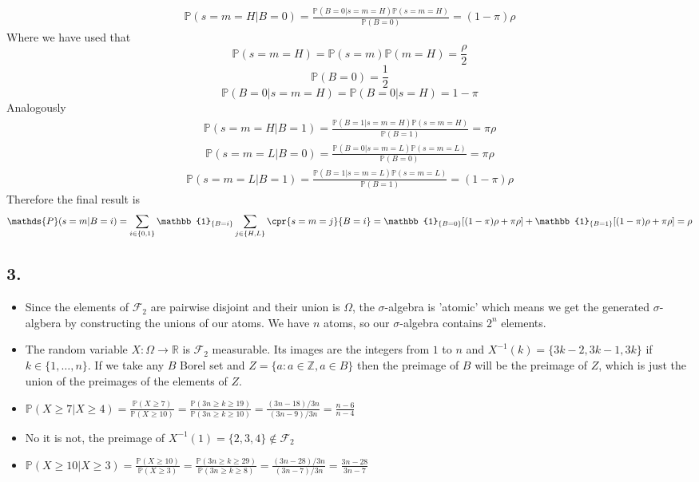     \begin{gather*}
    \mathds{P}(s=m=H|B=0)=\frac{\mathds{P}(B=0|s=m=H)\mathds{P}(s=m=H)}{\mathds{P}(B=0)} = (1-\pi)\rho
    \end{gather*}
    Where we have used that
    $$\mathds{P}(s=m=H)=\mathds{P}(s=m)\mathds{P}(m=H)=\frac{\rho}{2}$$
    $$\mathds{P}(B=0)=\frac{1}{2}$$
    $$\mathds{P}(B=0|s=m=H)=\mathds{P}(B=0|s=H)=1-\pi$$
    Analogously
    \begin{gather*}
    \mathds{P}(s=m=H|B=1)=\frac{\mathds{P}(B=1|s=m=H)\mathds{P}(s=m=H)}{\mathds{P}(B=1)} = \pi\rho
    \end{gather*}
    \begin{gather*}
    \mathds{P}(s=m=L|B=0)=\frac{\mathds{P}(B=0|s=m=L)\mathds{P}(s=m=L)}{\mathds{P}(B=0)} = \pi\rho
    \end{gather*}
        \begin{gather*}
    \mathds{P}(s=m=L|B=1)=\frac{\mathds{P}(B=1|s=m=L)\mathds{P}(s=m=L)}{\mathds{P}(B=1)} = (1-\pi)\rho
    \end{gather*}
    Therefore the final result is
    \begin{gather*}
        \mathds{P}(s=m|B=i)=\sum_{i\in\{0,1\}}\mathbb{1}_{\{B=i\}}
        \sum_{j\in\{H,L\}}\cpr{s=m=j}{B=i}=\mathbb{1}_{\{B=0\}}[(1-\pi)\rho+\pi\rho]+\mathbb{1}_{\{B=1\}}[(1-\pi)\rho+\pi\rho]=\rho
    \end{gather*}

\subsection*{3.}

\begin{itemize}
    \item Since the elements of $\mathcal{F}_2$ are pairwise disjoint and their union is $\Omega$, the $\sigma$-algebra is 'atomic' which means we get the generated $\sigma$-algbera by constructing the unions of our atoms. We have $n$ atoms, so our $\sigma$-algebra contains $2^n$ elements.
    \item The random variable $X: \Omega \to \mathbb{R}$ is $\mathcal{F}_2$ measurable. Its images are the integers from $1$ to $n$ and $X^{-1}(k)=\{3k-2, 3k-1, 3k\}$ if $k \in\{1,\ldots ,n\}$. If we take any $B$ Borel set and $Z=\{a: a\in \mathbb{Z}, a\in B\}$ then the preimage of $B$ will be the preimage of $Z$, which is just the union of the preimages of the elements of $Z$.
    \item $\displaystyle \mathbb{P}(X\geq 7 | X\geq 4)=\frac{\mathbb{P}(X\geq 7)}{\mathbb{P}(X\geq 10)}=\frac{\mathbb{P}(3n \geq k \geq 19)}{\mathbb{P}(3n\geq k\geq 10)}=\frac{(3n-18)/3n}{(3n-9)/3n}=\frac{n-6}{n-4}$
    \item No it is not, the preimage of $X^{-1}(1)=\{2, 3, 4\} \notin \mathcal{F}_2$
    \item $\displaystyle \mathbb{P}(X\geq 10 | X\geq 3)=\frac{\mathbb{P}(X\geq 10)}{\mathbb{P}(X\geq 3)}=\frac{\mathbb{P}(3n \geq k \geq 29)}{\mathbb{P}(3n\geq k\geq 8)}=\frac{(3n-28)/3n}{(3n-7)/3n}=\frac{3n-28}{3n-7}$
    
\end{itemize}

